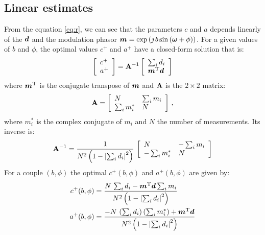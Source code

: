 \documentclass[a4paper,11pt,twoside]{scrartcl}
\begin{document}
\subsection{Linear estimates}
From the equation \ref{eq:r}, we can see that the parameters  $c$ and $a$ depends linearly of the  $\boldsymbol{d}$ and the modulation phasor $\boldsymbol{m} = \exp\left( \jmath \, b \sin\left( \boldsymbol{\omega} + \phi\right)\right)$. For a given values of $b$ and $\phi$, the optimal values $c^+$ and $a^+$ have a closed-form solution that is:
\begin{equation}
    \left[\begin{array}{l}
    c^+\\
    a^+
    \end{array}\right] = \mathbf{A}^{-1} 
    \left[\begin{array}{l}
    \sum_i d_i\\
    \boldsymbol{m}^{\mathrm{T}}\boldsymbol{d}
    \end{array}\right] 
\end{equation}
where $\boldsymbol{m}^{\mathrm{T}}$ is the conjugate transpose of $\boldsymbol{m}$ and $\mathbf{A}$ is the $2\times2$ matrix:
\begin{equation}
    \mathbf{A} = \left[\begin{array}{ll}
    N & \sum_i m_i\\
    \sum_i  m_i^* & N
    \end{array}\right] \,,
\end{equation}
where $m_i^*$ is the complex conjugate of $m_i$ and $N$  the number of measurements. Its inverse is:
\begin{equation}
   \mathbf{A}^{-1} =  \frac{1}{N^2 \left(1 - \left\vert  \sum_i d_i\right\vert^2\right)}\,\left[\begin{array}{ll}
    N & - \sum_i m_i\\
    - \sum_i  m_i^* & N
    \end{array}\right] 
\end{equation}
For a couple $(b,\phi)$ the optimal $c^+(b,\phi)$ and $a^+(b,\phi)$ are given by:
\begin{align}
    c^+(b,\phi) &= \frac{N\,\sum_i d_i - \boldsymbol{m}^{\mathrm{T}}\boldsymbol{d}\sum_i m_i}{N^2 \left(1 - \left\vert  \sum_i d_i\right\vert^2\right)}\\
    a^+(b,\phi) &= \frac{ -N\,\left(\sum_i d_i\right)  \left(\sum_i  m_i^*\right)+ \boldsymbol{m}^{\mathrm{T}}\boldsymbol{d}}{N^2 \left(1 - \left\vert  \sum_i d_i\right\vert^2\right)}
\end{align}
\end{document}
